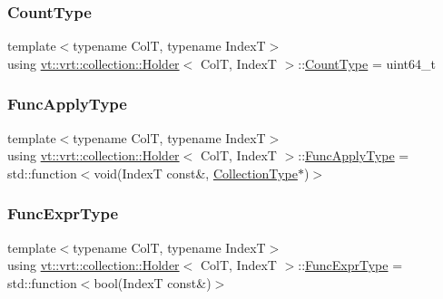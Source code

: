 \mbox{\label{structvt_1_1vrt_1_1collection_1_1_holder_a3251a556ac19fc7dc4d0bd388cfaedeb}} 
\subsubsection{\texorpdfstring{Count\+Type}{CountType}}
{\footnotesize\ttfamily template$<$typename ColT, typename IndexT$>$ \\
using \hyperlink{structvt_1_1vrt_1_1collection_1_1_holder}{vt\+::vrt\+::collection\+::\+Holder}$<$ ColT, IndexT $>$\+::\hyperlink{structvt_1_1vrt_1_1collection_1_1_holder_a3251a556ac19fc7dc4d0bd388cfaedeb}{Count\+Type} =  uint64\+\_\+t}

\mbox{\label{structvt_1_1vrt_1_1collection_1_1_holder_a26e20d23447e935e218a07ffd638706d}} 
\subsubsection{\texorpdfstring{Func\+Apply\+Type}{FuncApplyType}}
{\footnotesize\ttfamily template$<$typename ColT, typename IndexT$>$ \\
using \hyperlink{structvt_1_1vrt_1_1collection_1_1_holder}{vt\+::vrt\+::collection\+::\+Holder}$<$ ColT, IndexT $>$\+::\hyperlink{structvt_1_1vrt_1_1collection_1_1_holder_a26e20d23447e935e218a07ffd638706d}{Func\+Apply\+Type} =  std\+::function$<$void(IndexT const\&, \hyperlink{structvt_1_1vrt_1_1collection_1_1_holder_a38b4a4bfc4408cf28918c32433c80aac}{Collection\+Type}$\ast$)$>$}

\mbox{\label{structvt_1_1vrt_1_1collection_1_1_holder_a5c28963c09fd935028444c5a09fada2d}} 
\subsubsection{\texorpdfstring{Func\+Expr\+Type}{FuncExprType}}
{\footnotesize\ttfamily template$<$typename ColT, typename IndexT$>$ \\
using \hyperlink{structvt_1_1vrt_1_1collection_1_1_holder}{vt\+::vrt\+::collection\+::\+Holder}$<$ ColT, IndexT $>$\+::\hyperlink{structvt_1_1vrt_1_1collection_1_1_holder_a5c28963c09fd935028444c5a09fada2d}{Func\+Expr\+Type} =  std\+::function$<$bool(IndexT const\&)$>$}

